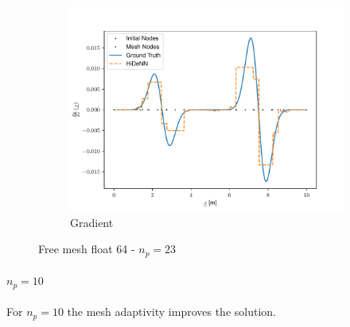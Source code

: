 \begin{figure}
\begin{subfigure}{0.3\linewidth}
        \includegraphics[width=\linewidth]{Figures/Solution_gradients_Regul64.pdf}
        \caption{Gradient}
    \end{subfigure}
    \caption{Free mesh float 64 - $n_p=23$}
    \label{fig:Fixed_Mesh23Float64}
\end{figure}


\paragraph{$n_p=10$}

For $n_p=10$ the mesh adaptivity improves the solution.


